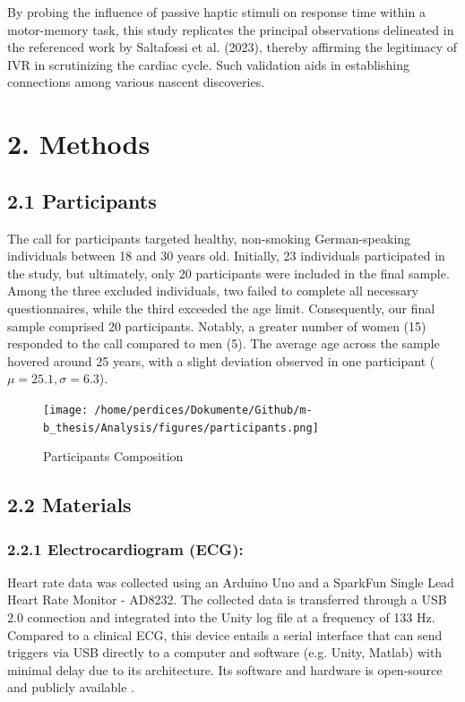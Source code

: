 \documentclass[12pt,oneside,openright]{report}
\begin{document}
By probing the influence of passive haptic stimuli on response time within a motor-memory task, this study replicates the principal observations delineated in the referenced work by Saltafossi et al. (2023), thereby affirming the legitimacy of IVR in scrutinizing the cardiac cycle. Such validation aids in establishing connections among various nascent discoveries.


\section*{2. Methods}
\subsection*{2.1 Participants}
The call for participants targeted healthy, non-smoking German-speaking individuals between 18 and 30 years old. Initially, 23 individuals participated in the study, but ultimately, only 20 participants were included in the final sample. Among the three excluded individuals, two failed to complete all necessary questionnaires, while the third exceeded the age limit. Consequently, our final sample comprised 20 participants. Notably, a greater number of women (15) responded to the call compared to men (5). The average age across the sample hovered around 25 years, with a slight deviation observed in one participant ($\mu=25.1, \sigma=6.3$).

\begin{figure}[h]
    \centering
    \texttt{[image: /home/perdices/Dokumente/Github/m-b\_thesis/Analysis/figures/participants.png]}
    \caption{Participants Composition}
    \label{fig:mesh1}
\end{figure}

    
\subsection*{2.2 Materials}
\subsubsection*{2.2.1 Electrocardiogram (ECG):}
Heart rate data was collected using an Arduino Uno and a SparkFun Single Lead Heart Rate Monitor - AD8232. The collected data is transferred through a USB 2.0 connection and integrated into the Unity log file at a frequency of 133 Hz. Compared to a clinical ECG, this device entails a serial interface that can send triggers via USB directly to a computer and software (e.g. Unity, Matlab) with minimal delay due to its architecture. Its software and hardware is open-source and publicly available \parencite{TimsECG}.
\end{document}
